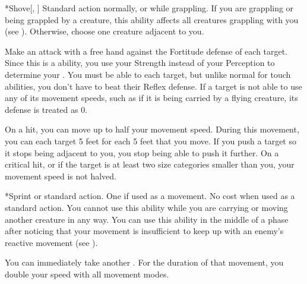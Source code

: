     \begin{activeability}*{Shove}[, ]
      \abilityusagetime Standard action normally, or  while grappling.
      \rankline
      If you are grappling or being grappled by a creature, this ability affects all creatures grappling with you (see ).
      Otherwise, choose one creature adjacent to you.

      Make an attack with a free hand against the Fortitude defense of each target.
      Since this is a  ability, you use your Strength instead of your Perception to determine your .
      You must be able to  each target, but unlike normal for touch abilities, you don't have to beat their Reflex defense.
      If a target is not able to use any of its movement speeds, such as if it is being carried by a flying creature, its defense is treated as 0.

      On a hit, you can move up to half your movement speed.
      During this movement, you can  each target 5 feet for each 5 feet that you move.
      If you push a target so it stops being adjacent to you, you stop being able to push it further.
      On a critical hit, or if the target is at least two size categories smaller than you, your movement speed is not halved.
    \end{activeability}

    \begin{activeability}*{Sprint}
      \abilityusagetime {} or standard action.
      \abilitycost One  if used as a movement. No cost when used as a standard action.
      \rankline
      You cannot use this ability while you are carrying or moving another creature in any way.
      You can use this ability in the middle of a phase after noticing that your movement is insufficient to keep up with an enemy's reactive movement (see ).

      You can immediately take another .
      For the duration of that movement, you double your speed with all movement modes.
    \end{activeability}

